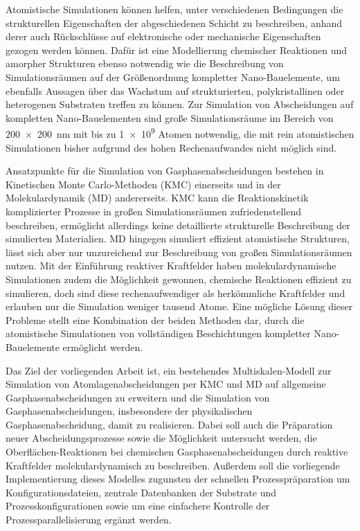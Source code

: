 Atomistische Simulationen können helfen, unter verschiedenen Bedingungen die strukturellen Eigenschaften der abgeschiedenen Schicht zu beschreiben, anhand derer auch Rückschlüsse auf elektronische\cite{aspnes_optical_1982,steudel_influence_2004} oder mechanische Eigenschaften\cite{chasiotis_mechanical_2003,cammarata_nanoindentation_1990} gezogen werden können.
Dafür ist eine Modellierung chemischer Reaktionen und amorpher Strukturen ebenso notwendig wie die Beschreibung von Simulationsräumen auf der Größenordnung kompletter Nano-Bauelemente, um ebenfalls Aussagen über das Wachstum auf strukturierten, polykristallinen oder heterogenen Substraten treffen zu können.
Zur Simulation von Abscheidungen auf kompletten Nano-Bauelementen sind große Simulationsräume im Bereich von \SI{200x200}{\nano\meter} mit bis zu \num{1e9} Atomen notwendig, die mit rein atomistischen Simulationen bisher aufgrund des hohen Rechenaufwandes nicht möglich sind\cite{plimpton_computational_1995}.

Ansatzpunkte für die Simulation von Gasphasenabscheidungen bestehen in Kinetischen Monte Carlo-Methoden (KMC)\cite{voter_introduction_2007} einerseits und in der Molekulardynamik (MD)\cite{hoover_molecular_1986} andererseits.
KMC kann die Reaktionskinetik komplizierter Prozesse in großen Simulationsräumen zufriedenstellend beschreiben, ermöglicht allerdings keine detaillierte strukturelle Beschreibung der simulierten Materialien.
MD hingegen simuliert effizient atomistische Strukturen, lässt sich aber nur unzureichend zur Beschreibung von großen Simulationsräumen nutzen.
Mit der Einführung reaktiver Kraftfelder haben molekulardynamische Simulationen zudem die Möglichkeit gewonnen, chemische Reaktionen effizient zu simulieren, doch sind diese rechenaufwendiger als herkömmliche Kraftfelder und erlauben nur die Simulation weniger tausend Atome\cite{van_duin_reaxff:_2001}.
Eine mögliche Lösung dieser Probleme stellt eine Kombination der beiden Methoden dar, durch die atomistische Simulationen von vollständigen Beschichtungen kompletter Nano-Bauelemente ermöglicht werden.


Das Ziel der vorliegenden Arbeit ist, ein bestehendes Multiskalen-Modell zur Simulation von Atomlagenabscheidungen per KMC und MD auf allgemeine Gasphasenabscheidungen zu erweitern und die Simulation von Gasphasenabscheidungen, insbesondere der physikalischen Gasphasenabscheidung, damit zu realisieren.
Dabei soll auch die Präparation neuer Abscheidungsprozesse sowie die Möglichkeit untersucht werden, die Oberflächen-Reaktionen bei chemischen Gasphasenabscheidungen durch reaktive Kraftfelder molekulardynamisch zu beschreiben.
Außerdem soll die vorliegende Implementierung dieses Modelles zugunsten der schnellen Prozesspräparation um Konfigurationsdateien, zentrale Datenbanken der Substrate und Prozesskonfigurationen sowie um eine einfachere Kontrolle der Prozessparallelisierung ergänzt werden.

